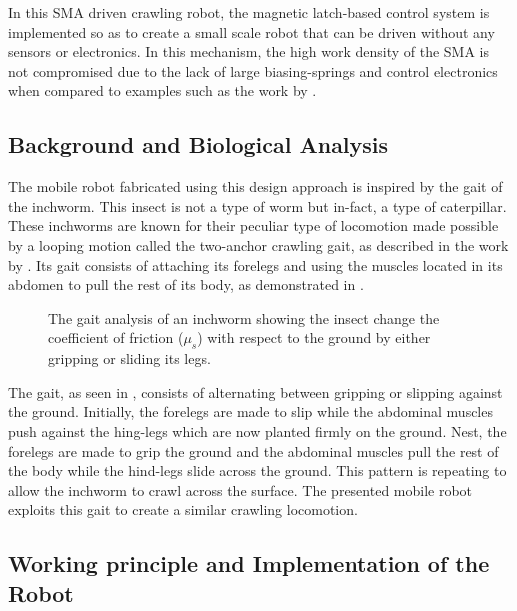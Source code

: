 In this SMA driven crawling robot, the magnetic latch-based control system is implemented so as to create a small scale robot that can be driven without any sensors or electronics. In this mechanism, the high work density of the SMA is not compromised due to the lack of large biasing-springs and control electronics when compared to examples such as the work by \todocite.

\subsection{Background and Biological Analysis}\label{subsec:bio-analysis}
The mobile robot fabricated using this design approach is inspired by the gait of the inchworm. This insect is not a type of worm but in-fact, a type of caterpillar. These inchworms are known for their peculiar type of locomotion made possible by a looping motion called the two-anchor crawling gait, as described in the work by \todocite. Its gait consists of attaching its forelegs and using the muscles located in its abdomen to pull the rest of its body, as demonstrated in \todocite.

\begin{figure}[ht!] %
  \centering
  \def\svgwidth{\textwidth}
  \resizebox{\textwidth}{!}{}
  \caption{The gait analysis of an inchworm showing the insect change the coefficient of friction ($\mu_s$) with respect to the ground by either gripping or sliding its legs.}
  \label{fig:real-inchworm-diagram}
\end{figure}

The gait, as seen in \todocite, consists of alternating between gripping or slipping against the ground. Initially, the forelegs are made to slip while the abdominal muscles push against the hing-legs which are now planted firmly on the ground. Nest, the forelegs are made to grip the ground and the abdominal muscles pull the rest of the body while the hind-legs slide across the ground. This pattern is repeating to allow the inchworm to crawl across the surface. The presented mobile robot exploits this gait to create a similar crawling locomotion.

\subsection{Working principle and Implementation of the Robot}

